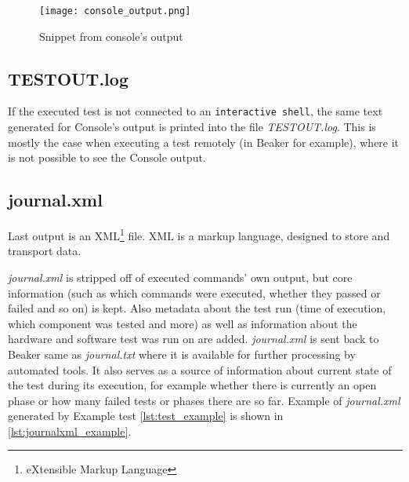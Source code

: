 \begin{figure}[h!]
  \texttt{[image: console\_output.png]}
  \caption{Snippet from console's output}
  \label{fig:console_output}
\end{figure}

\subsection{TESTOUT.log}
If the executed test is not connected to an \texttt{interactive shell}, the same text generated for Console's output is printed into the file \textit{TESTOUT.log}. This is mostly the case when executing a test remotely (in Beaker for example), where it is not possible to see the Console output.

\subsection{journal.xml}
Last output is an XML\footnote{eXtensible Markup Language} file. XML is a markup language, designed to store and transport data\cite{xml_intro}.

\textit{journal.xml} is stripped off of executed commands' own output, but core information (such as which commands were executed, whether they passed or failed and so on) is kept. Also metadata about the test run (time of execution, which component was tested and more) as well as information about the hardware and software test was run on are added. \textit{journal.xml} is sent back to Beaker same as \textit{journal.txt} where it is available for further processing by automated tools. It also serves as a source of information about current state of the test during its execution, for example whether there is currently an open phase or how many failed tests or phases there are so far. Example of \textit{journal.xml} generated by Example test \ref{lst:test_example} is shown in \ref{lst:journalxml_example}.

